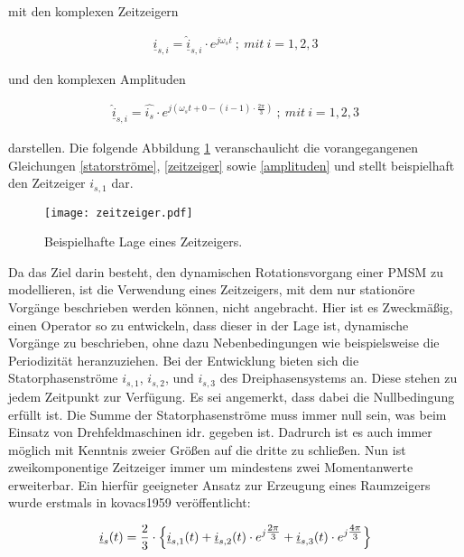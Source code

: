 mit den komplexen Zeitzeigern

\begin{align}
	\underline{i}_{s,i} = \underline{\hat i}_{s,i}\cdot e^{j\omega_{s}t}~;~mit~i=1,2,3 \label{zeitzeiger}
\end{align}

und den komplexen Amplituden

\begin{align}
	\underline{\hat i}_{s,i} = \hat{i_{s}}\cdot e^{j(\omega_{s}t+0-(i-1)\cdot\tfrac{2\pi}{3})}~;~mit~i=1,2,3 \label{amplituden}
\end{align}

darstellen. 
Die folgende Abbildung \ref{fig:zeitzeiger} veranschaulicht die vorangegangenen Gleichungen \ref{statorströme}, \ref{zeitzeiger} sowie \ref{amplituden} und stellt beispielhaft den Zeitzeiger $i_{s,1}$ dar.

\begin{figure}[h]
	\centering
	\texttt{[image: zeitzeiger.pdf]}
	\label{fig:zeitzeiger}
	\caption{Beispielhafte Lage eines Zeitzeigers.}
\end{figure}

Da das Ziel darin besteht, den dynamischen Rotationsvorgang einer PMSM zu modellieren, ist die Verwendung eines Zeitzeigers, mit dem nur stationöre Vorgänge beschrieben werden können, nicht angebracht. 
Hier ist es Zweckmäßig, einen Operator so zu entwickeln, dass dieser in der Lage ist, dynamische Vorgänge zu beschrieben, ohne dazu Nebenbedingungen wie beispielsweise die Periodizität heranzuziehen. 
Bei der Entwicklung bieten sich die Statorphasenströme $i_{s,1}$, $i_{s,2}$, und $i_{s,3}$ des Dreiphasensystems an.
Diese stehen zu jedem Zeitpunkt zur Verfügung. 
Es sei angemerkt, dass dabei die Nullbedingung erfüllt ist. 
Die Summe der Statorphasenströme muss immer null sein, was beim Einsatz von Drehfeldmaschinen idr. gegeben ist.
Dadrurch ist es auch immer möglich mit Kenntnis zweier Größen auf die dritte zu schließen.
Nun ist zweikomponentige Zeitzeiger immer um mindestens zwei Momentanwerte erweiterbar. 
Ein hierfür geeigneter Ansatz zur Erzeugung eines Raumzeigers wurde erstmals in kovacs1959 veröffentlicht:

\begin{align}
	\underline{i}_{s}(t) = \frac{2}{3} \cdot \Bigl\{\underline{i}_{s,1}(t) + \underline{i}_{s,2}(t)\cdot e^{j\tfrac{2\pi}{3}} + \underline{i}_{s,3}(t)\cdot e^{j\tfrac{4\pi}{3}} \Bigr\} \label{statorstromzeiger}
\end{align}

